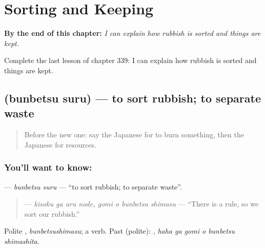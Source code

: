 
\chapter{Sorting and Keeping}
\label{ch:ja-sorting-and-keeping}

\begin{chapteropening}
\textbf{By the end of this chapter:} \emph{I can explain how rubbish is sorted and things are kept.}

Complete the last lesson of chapter 339: I can explain how rubbish is sorted and things are kept.
\end{chapteropening}

\section[\texorpdfstring{\ja{ぶんべつする} (bunbetsu suru)}{ぶんべつする (bunbetsu suru)}]{ (bunbetsu suru) — to sort rubbish; to separate waste}

\label{lesson:JA-C339-bunbetsu-suru}



\begin{quote}
Before the new one: say the Japanese for to burn something, then the Japanese for resources.
\end{quote}

\subsection*{You'll want to know: }
\textbf{} — \emph{bunbetsu suru} — \textquotedblleft{}to sort rubbish; to separate waste\textquotedblright{}.

\begin{quote}
\textbf{  } — \emph{kisoku ga aru node, gomi o bunbetsu shimasu} — \textquotedblleft{}There is a rule, so we sort our rubbish.\textquotedblright{}
\end{quote}

Polite \textbf{}, \emph{bunbetsushimasu}; a  verb. Past (polite): \textbf{  }, \emph{haha ga gomi o bunbetsu shimashita}.

